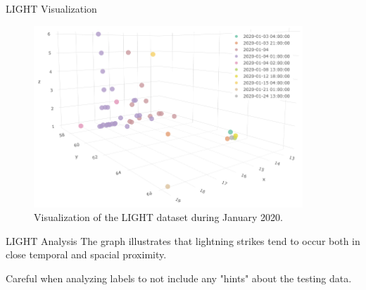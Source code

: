 \documentclass[10pt]{beamer}
\begin{document}
\begin{frame}{LIGHT Visualization}
\begin{figure}
	\label{light-analysis}
	\includegraphics[width=0.9\textwidth]{figures/light-analysis}
	\caption{Visualization of the LIGHT dataset during January 2020.}
\end{figure}
\end{frame}


\begin{frame}{LIGHT Analysis}
The graph illustrates that lightning strikes tend to occur both in close temporal and spacial proximity.

Careful when analyzing labels to not include any "hints" about the testing data.
\end{frame}
\end{document}
